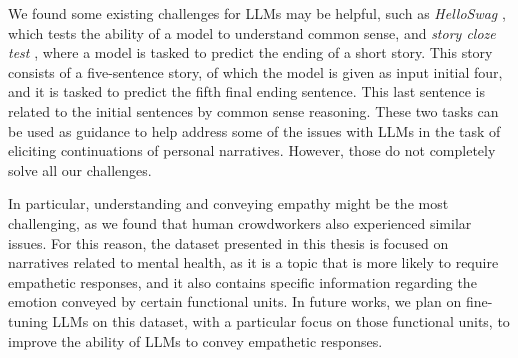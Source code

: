 We found some existing challenges for LLMs may be helpful, such as \emph{HelloSwag} \cite{HellaSwag}, which tests the ability of a model to understand common sense, and \emph{story cloze test} \cite{mostafazadeh2016corpus}, where a model is tasked to predict the ending of a short story. This story consists of a five-sentence story, of which the model is given as input initial four, and it is tasked to predict the fifth final ending sentence. This last sentence is related to the initial sentences by common sense reasoning. These two tasks can be used as guidance to help address some of the issues with LLMs in the task of eliciting continuations of personal narratives. However, those do not completely solve all our challenges.

In particular, understanding and conveying empathy might be the most challenging, as we found that human crowdworkers also experienced similar issues. For this reason, the dataset presented in this thesis is focused on narratives related to mental health, as it is a topic that is more likely to require empathetic responses, and it also contains specific information regarding the emotion conveyed by certain functional units. In future works, we plan on fine-tuning LLMs on this dataset, with a particular focus on those functional units, to improve the ability of LLMs to convey empathetic responses.

